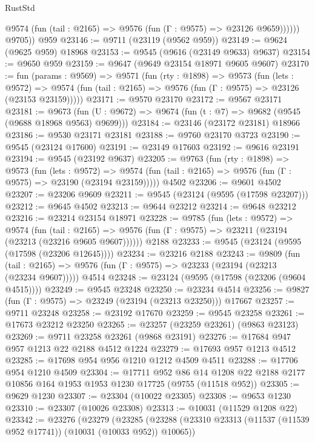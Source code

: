 \begin{lexlean}{RustStd}
\begin{coremodule}
              @9574 (fun (tail : @2165) => @9576 (fun (Γ : @9575) => @23126 @9659))))))
        @9705))
    @959
@23146 := @9711 (@23119 (@9562 @959))
@23149 := @9624 (@9625 @959) @18968
@23153 := @9545 (@9616 (@23149 @9633) @9637)
@23154 := @9650 @959
@23159 := @9647 (@9649 @23154 @18971 @9605 @9607)
@23170 := fun (params : @9569) =>
  @9571
    (fun (rty : @1898) =>
    @9573
      (fun (lets : @9572) =>
      @9574 (fun (tail : @2165) => @9576 (fun (Γ : @9575) => @23126 (@23153 @23159)))))
@23171 := @9570 @23170
@23172 := @9567 @23171
@23181 := @9673
    (fun (U : @9672) => @9674 (fun (t : @7) => @9682 (@9545 (@9688 @18968 @9563) @9699)))
@23184 := @23146 (@23172 @23181) @18966
@23186 := @9530 @23171 @23181
@23188 := @9760 @23170 @3723
@23190 := @9545 (@23124 @17600)
@23191 := @23149 @17603
@23192 := @9616 @23191
@23194 := @9545 (@23192 @9637)
@23205 := @9763
    (fun (rty : @1898) =>
    @9573
      (fun (lets : @9572) =>
      @9574 (fun (tail : @2165) => @9576 (fun (Γ : @9575) => @23190 (@23194 @23159)))))
    @4502
@23206 := @9601 @4502
@23207 := @23206 @9609
@23211 := @9545 (@23124 (@9595 (@17598 @23207)))
@23212 := @9645 @4502
@23213 := @9644 @23212
@23214 := @9648 @23212
@23216 := @23214 @23154 @18971
@23228 := @9785
    (fun (lets : @9572) =>
    @9574
      (fun (tail : @2165) =>
      @9576 (fun (Γ : @9575) => @23211 (@23194 (@23213 (@23216 @9605 @9607))))))
    @2188
@23233 := @9545 (@23124 (@9595 (@17598 (@23206 @12645))))
@23234 := @23216 @2188
@23243 := @9809
    (fun (tail : @2165) => @9576 (fun (Γ : @9575) => @23233 (@23194 (@23213 (@23234 @9607)))))
    @4514
@23248 := @23124 (@9595 (@17598 (@23206 (@9604 @4515))))
@23249 := @9545 @23248
@23250 := @23234 @4514
@23256 := @9827 (fun (Γ : @9575) => @23249 (@23194 (@23213 @23250))) @17667
@23257 := @9711 @23248
@23258 := @23192 @17670
@23259 := @9545 @23258
@23261 := @17673 @23212 @23250
@23265 := @23257 (@23259 @23261) (@9863 @23123)
@23269 := @9711 @23258 @23261 (@9868 @23191)
@23276 := @17684 @947 @957 @1213 @22 @2188 @4512 @1224
@23279 := @17693 @957 @1213 @4512
@23285 := @17698 @954 @956 @1210 @1212 @4509 @4511
@23288 := @17706 @954 @1210 @4509
@23304 := @17711
    @952
    @86
    @14
    @1208
    @22
    @2188
    @2177
    @10856
    @164
    @1953
    @1953
    @1230
    @17725
    (@9755 (@11518 @952))
@23305 := @9629 @1230
@23307 := @23304 (@10022 @23305)
@23308 := @9653 @1230
@23310 := @23307 (@10026 @23308)
@23313 := @10031 (@11529 @1208 @22)
@23342 := @23276
    (@23279
      (@23285
        (@23288 (@23310 @23313 (@11537 (@11539 @952 @17741)) (@10031 (@10033 @952)) @10065))

\end{coremodule}
\end{lexlean}
